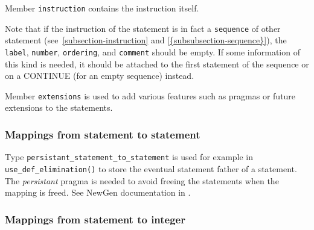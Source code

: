 \documentclass[a4paper]{article}
\begin{document}
\begin{comment}
Le sous-domaine \texttt{comments} contient le texte du commentaire associ�
a ce statement dans le programme initial; ce texte est utilis� par le
prettyprinter. Ce sont les commentaires qui pr�c�dent le statement
qui s'y trouvent associ�s. En l'absence de commentaires, ce champ
prend la valeur \verb/string_undefined/. Les commentaires associ�s �
des instructions qui peuvent dispara�tre au cours des traitements comme
CONTINUE, RETURN et GOTO, peuvent aussi disparaitre.
\end{comment}

Member \texttt{instruction} contains the instruction itself.

\begin{comment}
Le sous-domaine \verb/instruction/ contient
l'instruction proprement dite.
\end{comment}

%
\label{Statement/Instruction/Sequence}Note
that if the instruction of the statement is in fact a \verb|sequence|
of other statement (see~\ref{subsection-instruction} and
\ref{{subsubsection-sequence}}), the \verb|label|, \verb|number|,
\verb|ordering|, and \verb|comment| should be empty. If some
information of this kind is needed, it should be attached to the first
statement of the sequence or on a CONTINUE (for an empty sequence)
instead.

Member \texttt{extensions} is used to add various features such as pragmas
or future extensions to the statements.

\subsubsection{Mappings from statement to statement}

{}

Type \texttt{persistant\_statement\_to\_statement} is used for example in
\verb/use_def_elimination()/ to store the eventual statement father of a
statement. The \emph{persistant} pragma is needed to avoid freeing the
statements when the mapping is freed. See NewGen documentation in
\cite{JT90}.

\subsubsection{Mappings from statement to integer}
\end{document}
